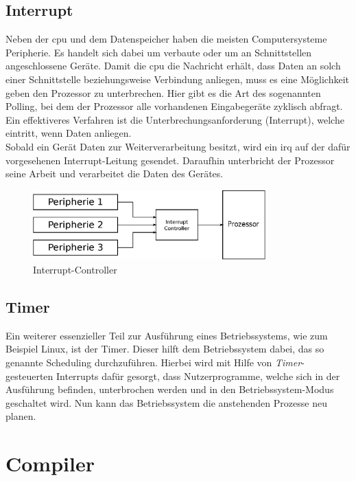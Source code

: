 \subsection{Interrupt}\label{kap:interrupt}
Neben der \ac{cpu} und dem Datenspeicher haben die meisten Computersysteme Peripherie. Es handelt sich dabei um verbaute oder um an Schnittstellen angeschlossene Geräte.
Damit die \ac{cpu} die Nachricht erhält, dass Daten an solch einer Schnittstelle beziehungsweise Verbindung anliegen, muss es eine Möglichkeit geben den Prozessor zu
unterbrechen. Hier gibt es die Art des sogenannten Polling, bei dem der Prozessor alle vorhandenen Eingabegeräte zyklisch abfragt. Ein effektiveres Verfahren ist die
Unterbrechungsanforderung (Interrupt), welche eintritt, wenn Daten anliegen. \\
Sobald ein Gerät Daten zur Weiterverarbeitung besitzt, wird ein \ac{irq} auf der dafür vorgesehenen Interrupt-Leitung gesendet. Daraufhin unterbricht der Prozessor
seine Arbeit und verarbeitet die Daten des Gerätes.\cite{irq}\\

\begin{figure}[H]
\centering
\includegraphics[width=0.8\textwidth]{Hauptteil/irq.eps}
\caption{Interrupt-Controller}\label{fig:irq}
\end{figure}

\subsection{Timer}\label{kap:timer}

Ein weiterer essenzieller Teil zur Ausführung eines Betriebssystems, wie zum Beispiel Linux, ist der Timer. Dieser hilft dem Betriebssystem dabei, das so genannte Scheduling
durchzuführen. Hierbei wird mit Hilfe von \emph{Timer}-gesteuerten Interrupts dafür gesorgt, dass Nutzerprogramme, welche sich in der Ausführung befinden, unterbrochen werden und
in den Betriebssystem-Modus geschaltet wird. Nun kann das Betriebssystem die anstehenden Prozesse neu planen.\\


\section{Compiler}\label{kap:compiler}


